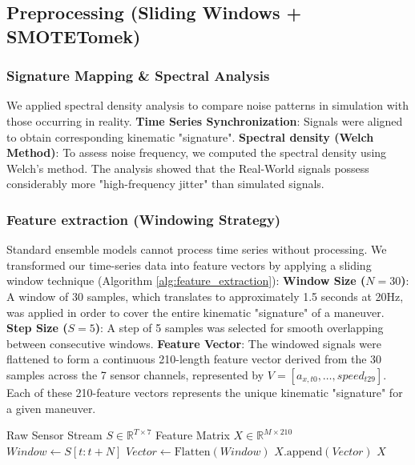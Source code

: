 \documentclass[pdflatex,sn-mathphys-num]{sn-jnl}
\theoremstyle{thmstyleone}
\theoremstyle{thmstyletwo}
\theoremstyle{thmstylethree}
\begin{document}
\FloatBarrier
\subsection{Preprocessing (Sliding Windows + SMOTETomek)}

\FloatBarrier
\subsubsection{Signature Mapping \& Spectral Analysis}
We applied spectral density analysis to compare noise patterns in simulation with those occurring in reality.
\textbf{Time Series Synchronization}: Signals were aligned to obtain corresponding kinematic "signature".
\textbf{Spectral density (Welch Method)}: To assess noise frequency, we computed the spectral density using Welch's method. The analysis showed that the Real-World signals possess considerably more "high-frequency jitter" than simulated signals.

\FloatBarrier
\subsubsection{Feature extraction (Windowing Strategy)}
Standard ensemble models cannot process time series without processing. We transformed our time-series data into feature vectors by applying a sliding window technique (Algorithm \ref{alg:feature_extraction}):
\textbf{Window Size ($N=30$)}: A window of 30 samples, which translates to approximately 1.5 seconds at 20Hz, was applied in order to cover the entire kinematic "signature" of a maneuver.
\textbf{Step Size ($S=5$)}: A step of 5 samples was selected for smooth overlapping between consecutive windows.
\textbf{Feature Vector}: The windowed signals were flattened to form a continuous 210-length feature vector derived from the 30 samples across the 7 sensor channels, represented by $V=[a_{x,t0}, \dots, speed_{t29}]$. Each of these 210-feature vectors represents the unique kinematic "signature" for a given maneuver.

\begin{algorithm}
\caption{Feature Extraction \& Flattening}\label{alg:feature_extraction}
\begin{algorithmic}[1]
\Require Raw Sensor Stream $S \in \mathbb{R}^{T \times 7}$
\Ensure Feature Matrix $X \in \mathbb{R}^{M \times 210}$
    \State $Window \gets S[t : t+N]$
    \State $Vector \gets \text{Flatten}(Window)$ 
\State $X.\text{append}(Vector)$
\EndFor
\State \Return $X$
\end{algorithmic}
\end{algorithm}
\end{document}
